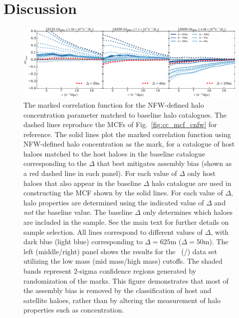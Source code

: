 \documentclass[usenatbib,fleqn]{mnras}
\begin{document}
\section{Discussion}
\label{section:discussion}

\begin{figure}
	\centering
	\includegraphics[width=\textwidth]{match_mcf_cNFW.pdf}
	\caption{The marked correlation function for the NFW-defined halo concentration parameter matched to baseline halo catalogues. The dashed lines reproduce the MCFs of Fig.~\ref{fig:cc_mcf_cnfw} for reference. The solid lines plot the marked correlation function using NFW-defined halo concentration as the mark, for a catalogue of host haloes matched to the host haloes in the baseline catalogue corresponding to the $\Delta$ that best mitigates assembly bias (shown as a red dashed line in each panel). For each value of $\Delta$ only host haloes that also appear in the baseline $\Delta$ halo catalogue are used in constructing the MCF shown by the solid lines. For each value of $\Delta$, halo properties are determined using the indicated value of $\Delta$ and {\em not} the baseline value. The baseline $\Delta$ only determines which haloes are included in the sample. See the main text for further details on sample selection. All lines correspond to different values of $\Delta$, with dark blue (light blue) corresponding to $\Delta = 625$m ($\Delta = 50$m). The left (middle/right) panel shows the results for the \simA \ (\simB /\simC) data set utilizing the low mass (mid mass/high mass) cutoffs. The shaded bands represent 2-sigma confidence regions generated by randomization of the marks. This figure demonstrates that most of the assembly bias is removed by the classification of host and satellite haloes, rather than by altering the measurement of halo properties such as concentration. 
\label{fig:hvm_mcf_cnfw}
}
\end{figure}
\end{document}
